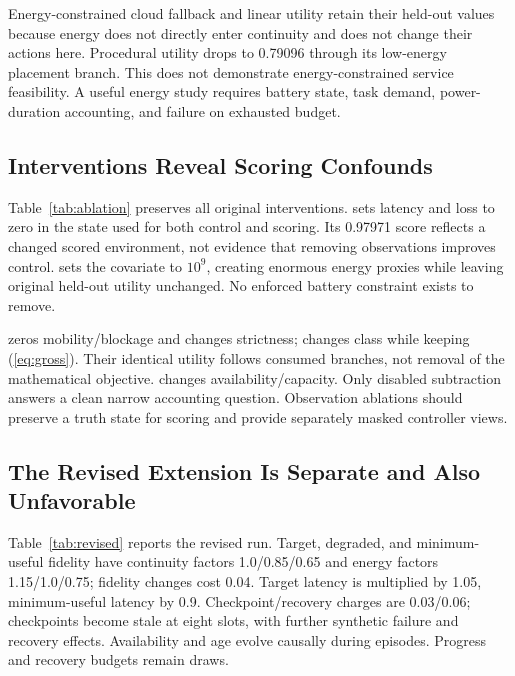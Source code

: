 Energy-constrained cloud fallback and linear utility retain their held-out values because energy does not directly enter continuity and does not change their actions here. Procedural utility drops to 0.79096 through its low-energy placement branch. This does not demonstrate energy-constrained service feasibility. A useful energy study requires battery state, task demand, power-duration accounting, and failure on exhausted budget.

\subsection{Interventions Reveal Scoring Confounds}
Table~\ref{tab:ablation} preserves all original interventions.  sets latency and loss to zero in the state used for both control and scoring. Its 0.97971 score reflects a changed scored environment, not evidence that removing observations improves control.  sets the covariate to $10^9$, creating enormous energy proxies while leaving original held-out utility unchanged. No enforced battery constraint exists to remove.

\begin{table}[t]
\caption{Original procedural interventions. Several change scoring inputs and are not isolated observation ablations.}\label{tab:ablation}
\centering\small
\end{table}

 zeros mobility/blockage and changes strictness;  changes class while keeping (\ref{eq:gross}). Their identical utility follows consumed branches, not removal of the mathematical objective.  changes availability/capacity. Only disabled subtraction answers a clean narrow accounting question. Observation ablations should preserve a truth state for scoring and provide separately masked controller views.

\subsection{The Revised Extension Is Separate and Also Unfavorable}
Table~\ref{tab:revised} reports the revised run. Target, degraded, and minimum-useful fidelity have continuity factors 1.0/0.85/0.65 and energy factors 1.15/1.0/0.75; fidelity changes cost 0.04. Target latency is multiplied by 1.05, minimum-useful latency by 0.9. Checkpoint/recovery charges are 0.03/0.06; checkpoints become stale at eight slots, with further synthetic failure and recovery effects. Availability and age evolve causally during episodes. Progress and recovery budgets remain draws.

